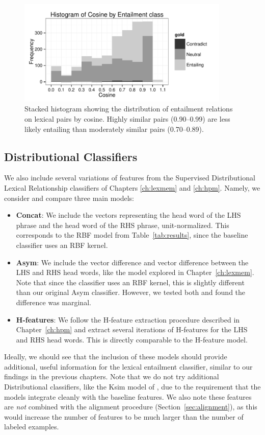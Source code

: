 \begin{figure}
  \centering
  \includegraphics[width=0.90\textwidth]{plots/valley.pdf}
  \caption{Stacked histogram showing the distribution of entailment relations on lexical pairs by cosine.
    Highly similar pairs (0.90--0.99) are less likely entailing than moderately
    similar pairs (0.70--0.89).}
  \label{fig:valley}
\end{figure}

\subsection{Distributional Classifiers}

We also include several variations of features from the Supervised
Distributional Lexical Relationship classifiers of Chapters \ref{ch:lexmem} and
\ref{ch:hpm}. Namely, we consider and compare three main models:
\begin{itemize}
  \item {\bf Concat}: We include the vectors representing the head word of the
    LHS phrase and the head word of the RHS phrase, unit-normalized. This
    corresponds to the RBF model from Table~\ref{tab:results}, since the
    baseline classifier uses an RBF kernel.
  \item {\bf Asym}: We include the vector difference and vector difference
    between the LHS and RHS head words, like the model explored in
    Chapter~\ref{ch:lexmem}. Note that since the classifier uses an RBF kernel,
    this is slightly different than our original Asym classifier. However,
    we tested both and found the difference was marginal.
  \item {\bf H-features}: We follow the H-feature extraction procedure described
    in Chapter~\ref{ch:hpm} and extract several iterations of H-features
    for the LHS and RHS head words. This is directly comparable to the
    H-feature model.
\end{itemize}
Ideally, we should see that the inclusion of these models should provide
additional, useful information for the lexical entailment classifier, similar
to our findings in the previous chapters. Note that we do not try additional
Distributional classifiers, like the Ksim model of ,
due to the requirement that the models integrate cleanly with the baseline
features. We also note these features are {\em not} combined with the
alignment procedure (Section~\ref{sec:alignment}), as this would increase
the number of features to be much larger than the number of labeled examples.

